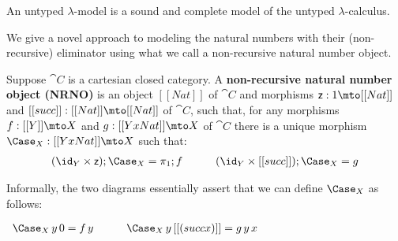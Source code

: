 \begin{theorem}
  \label{thm:untyped-lambda-model-sound-complete}
  An untyped $\lambda$-model is a sound and complete model of the untyped $\lambda$-calculus.
\end{theorem}

We give a novel approach to modeling the natural numbers with their
(non-recursive) eliminator using what we call a non-recursive natural
number object.
\begin{definition}
  \label{def:SNNO}
  Suppose $\cat{C}$ is a cartesian closed category.  A
  \textbf{non-recursive natural number object (NRNO)} is an object
  $[[Nat]]$ of $\cat{C}$ and morphisms $\mathsf{z} : 1 \mto [[Nat]]$
  and $[[succ]] : [[Nat]] \mto [[Nat]]$ of $\cat{C}$, such that, for
  any morphisms $f : [[Y]] \mto X$ and $g : [[Y x Nat]] \mto X$ of
  $\cat{C}$ there is a unique morphism $\Case_X : [[Y x Nat]] \mto X$
  such that:
  \[
  \begin{array}{lll}
    (\id_Y \times \mathsf{z});\Case_X = \pi_1;f
    & \quad & 
    (\id_Y \times [[succ]]);\Case_X = g
  \end{array}
  \]

  \noindent
       Informally, the two diagrams essentially assert that we can
       define $\Case_X$ as follows:
       \begin{center}
         \begin{math}
           \begin{array}{ccccccccccc}
             {\Case_X\,y\,0 = f\,y}
             & \quad & 
             {\Case_X\,y\,[[(succ x)]] =  g\,y\,x}
           \end{array}
         \end{math}
       \end{center}
\end{definition}

